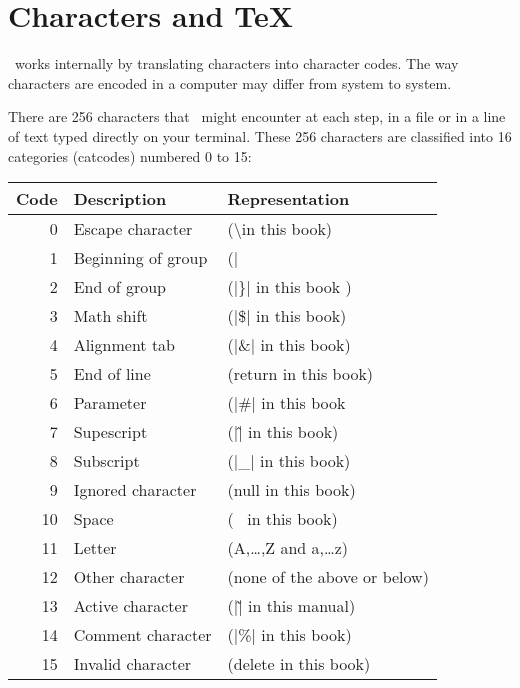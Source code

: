 
\chapter{Characters and TeX}
\label{ch:characters}

\normalsize

\tex\ works internally by translating characters into character codes. The way characters are encoded in a computer may differ from system to system.

There are 256 characters that \tex\  might encounter at
each step, in a file or in a line of text typed directly on your terminal. These
256 characters are classified into 16 categories (catcodes) numbered 0 to 15:



\begin{table}[htbp]
\centering
\begin{tabular}{rll}
\toprule
Code & Description & Representation\\
\midrule
0 & Escape character & (\textbackslash in this book)\\
1 & Beginning of group & (|{| in this book)\\
2 & End of group & (|\}| in this book )\\
3 & Math shift & (|\$| in this book)\\
4 & Alignment tab & (|\&| in this book)\\
5 & End of line &(return in this book)\\
6 & Parameter &(|\#| in this book\\
7 & Supescript &(|\^| in this book)\\
8 & Subscript &(|\_| in this book)\\
9 & Ignored character &(null in this book)\\
10 & Space &(\verb*+ + in this book)\\
11 &Letter &(A,\ldots,Z and a,\ldots z)\\
12 &Other character &(none of the above or below)\\
13 &Active character &(|\~| in this manual)\\
14 &Comment character &(|\%| in this book)\\
15 &Invalid character &(delete in this book)\\
\bottomrule
\end{tabular}
\end{table}
\medskip

